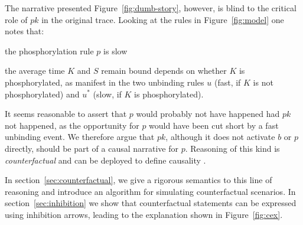 

The narrative presented Figure~\ref{fig:dumb-story}, however, is blind
to the critical role of $pk$ in the original trace. Looking at the
rules in Figure~\ref{fig:model} one notes that:
\begin{inparaenum}[i)]
\item the phosphorylation rule $p$ is slow
\item the average time $K$ and $S$ remain bound depends on whether $K$
  is phosphorylated, as manifest in the two unbinding rules $u$ (fast,
  if $K$ is not phosphorylated) and $u^{*}$ (slow, if $K$ is
  phosphorylated).
\end{inparaenum} It seems reasonable to assert that $p$ would probably
not have happened had $pk$ not happened, as the opportunity for $p$
would have been cut short by a fast unbinding event. We therefore
argue that $pk$, although it does not activate $b$ or $p$ directly,
should be part of a causal narrative for $p$. Reasoning of this kind
is \textit{counterfactual} and can be deployed to define causality
\cite{lewis1974causation,pearl2009causality}.

In section~\ref{sec:counterfactual}, we give a rigorous semantics to
this line of reasoning and introduce an algorithm for simulating
counterfactual scenarios. In section~\ref{sec:inhibition} we show that
counterfactual statements can be expressed using inhibition arrows,
leading to the explanation shown in Figure~\ref{fig:cex}.